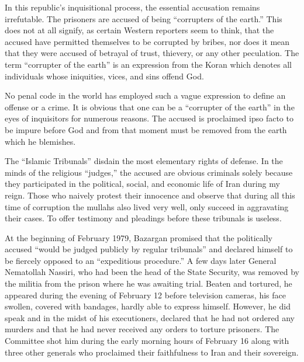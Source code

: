 In this republic's inquisitional process, the essential accusation remains irrefutable. The prisoners are accused of being “corrupters of the earth.” This does not at all signify, as certain Western reporters seem to think, that the accused have permitted themselves to be corrupted by bribes, nor does it mean that they were accused of betrayal of trust, thievery, or any other peculation. The term “corrupter of the earth” is an expression from the Koran which denotes all individuals whose iniquities, vices, and sins offend God. 

No penal code in the world has employed such a vague expression to define an offense or a crime. It is obvious that one can be a “corrupter of the earth” in the eyes of inquisitors for numerous reasons. The accused is proclaimed ipso facto to be impure before God and from that moment must be removed from the earth which he blemishes. 

The “Islamic Tribunals” disdain the most elementary rights of defense. In the minds of the religious “judges,” the accused are obvious criminals solely because they participated in the political, social, and economic life of Iran during my reign. Those who naively protest their innocence and observe that during all this time of corruption the mullahs also lived very well, only succeed in aggravating their cases. To offer testimony and pleadings before these tribunals is useless. 

At the beginning of February 1979, Bazargan promised that the politically accused “would be judged publicly by regular tribunals” and declared himself to be fiercely opposed to an “expeditious procedure.” A few days later General Nematollah Nassiri, who had been the head of the State Security, was removed by the militia from the prison where he was awaiting trial. Beaten and tortured, he appeared during the evening of February 12 before television cameras, his face swollen, covered with bandages, hardly able to express himself. However, he did speak and in the midst of his executioners, declared that he had not ordered any murders and that he had never received any orders to torture prisoners. The Committee shot him during the early morning hours of February 16 along with three other generals who proclaimed their faithfulness to Iran and their sovereign. 

